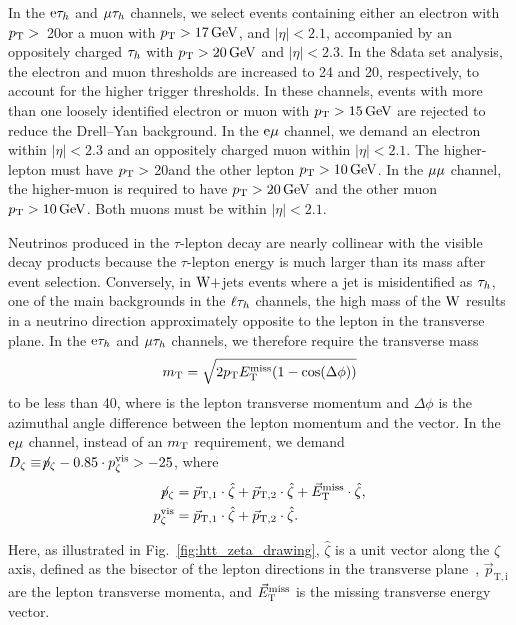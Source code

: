 \documentclass[11pt,twoside,a4paper,cmspaper,final,collab]{cms-tdr}
\begin{document}
In the $\mathrm{e}\tau_h$ and ${\mu}\tau_h$ channels, we select events containing either an electron
with  $p_{\mathrm{T}} >$~20\GeV or a muon with  $p_{\mathrm{T}} >17\,\text{Ge\hspace{-.08em}V}$, and $|\eta| < 2.1$,
accompanied by an oppositely charged $\tau_h$ with $p_{\mathrm{T}} > 20\,\text{Ge\hspace{-.08em}V}$ and $|\eta| < 2.3$.
In the 8\TeV data set analysis, the electron and muon \pt thresholds are
increased to 24 and 20\GeV, respectively, to account for the higher trigger thresholds.
In these channels,
events with more than one loosely identified electron or muon with $p_{\mathrm{T}} >15\,\text{Ge\hspace{-.08em}V}$ are rejected to reduce the Drell--Yan background.
In the $\mathrm{e}{\mu}$ channel, we demand an electron within $|\eta|<2.3$ and an oppositely charged muon within $|\eta|<2.1$.
The higher-\pt lepton must have $p_{\mathrm{T}} >$ 20\GeV and the other lepton $p_{\mathrm{T}} >10\,\text{Ge\hspace{-.08em}V}$.
In the ${\mu}{\mu}$ channel, the higher-\pt muon is required to have $p_{\mathrm{T}}>20\,\text{Ge\hspace{-.08em}V}$ and the other muon $p_{\mathrm{T}}>10\,\text{Ge\hspace{-.08em}V}$.
Both muons must be within $|\eta|<2.1$.

Neutrinos produced in the $\tau$-lepton decay are nearly collinear with the visible decay products
because the $\tau$-lepton energy is much larger than its mass after event selection.
Conversely, in
$\mathrm{W}+$jets events where a jet is misidentified as $\tau_h$, one of the main backgrounds in the $\ell\tau_h$ channels,
the high mass of the
$\mathrm{W}$ results in a neutrino direction approximately opposite to the lepton in the transverse plane.
In the $\mathrm{e}\tau_h$ and ${\mu}\tau_h$ channels, we therefore require the transverse mass
\begin{equation}
m_\mathrm{T} = \sqrt{2 p_{\mathrm{T}} E_{\mathrm{T}}^{\text{miss}} (1-\cos(\Delta\phi))}
\end{equation}
to be less than 40\GeV, where \pt is the lepton transverse momentum
and $\Delta\phi$ is the azimuthal angle difference between the lepton momentum and the \MET vector.
In the $\mathrm{e}{\mu}$ channel, instead of an $m_\mathrm{T}$ requirement, we demand
$D_{\zeta} \equiv \not\!{p_\zeta}- 0.85 \cdot p_\zeta^{\text{vis}} > -25$\GeV, where
\begin{align}
\not\!{p_{\zeta}} &=\vec p_\mathrm{T,1} \cdot \hat \zeta + \vec p_\mathrm{T,2} \cdot \hat \zeta+ {\vec E}_{\mathrm{T}}^{\text{miss}} \cdot \hat \zeta, \\
p_{\zeta}^{\text{vis}} &= \vec{p}_\mathrm{T,1} \cdot \hat \zeta + \vec{p}_\mathrm{T,2} \cdot \hat \zeta.
\end{align}

Here, as illustrated in Fig.~\ref{fig:htt_zeta_drawing}, $\hat \zeta$ is a unit vector along the $\zeta$ axis, defined as the bisector of the lepton directions in the transverse plane~\cite{CRISTOBAL}, $\vec p_\mathrm{T,i}$ are the lepton transverse momenta, and ${\vec E}_{\mathrm{T}}^{\text{miss}}$ is the missing transverse energy vector.
\end{document}
